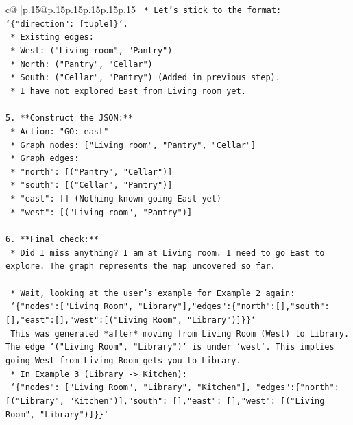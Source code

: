 \documentclass{article}
\begin{document}
{\begin{supertabular}{c@{$\;$}|p{.15\linewidth}@{}p{.15\linewidth}p{.15\linewidth}p{.15\linewidth}p{.15\linewidth}p{.15\linewidth}}
{{{\texttt{        *   Let's stick to the format: `\{"direction": {[}tuple{]}\}`.} \\
\texttt{        *   Existing edges:} \\
\texttt{            *   West: ("Living room", "Pantry")} \\
\texttt{            *   North: ("Pantry", "Cellar")} \\
\texttt{            *   South: ("Cellar", "Pantry") (Added in previous step).} \\
\texttt{    *   I have not explored East from Living room yet.} \\
\\ 
\texttt{5.  **Construct the JSON:**} \\
\texttt{    *   Action: "GO: east"} \\
\texttt{    *   Graph nodes: {[}"Living room", "Pantry", "Cellar"{]}} \\
\texttt{    *   Graph edges:} \\
\texttt{        *   "north": {[}("Pantry", "Cellar"){]}} \\
\texttt{        *   "south": {[}("Cellar", "Pantry"){]}} \\
\texttt{        *   "east": {[}{]} (Nothing known going East yet)} \\
\texttt{        *   "west": {[}("Living room", "Pantry"){]}} \\
\\ 
\texttt{6.  **Final check:**} \\
\texttt{    *   Did I miss anything? I am at Living room. I need to go East to explore. The graph represents the map uncovered so far.} \\
\\ 
\texttt{    *   Wait, looking at the user's example for Example 2 again:} \\
\texttt{        `\{"nodes":{[}"Living Room", "Library"{]},"edges":\{"north":{[}{]},"south":{[}{]},"east":{[}{]},"west":{[}("Living Room", "Library"){]}\}\}`} \\
\texttt{        This was generated *after* moving from Living Room (West) to Library. The edge `("Living Room", "Library")` is under `west`. This implies going West from Living Room gets you to Library.} \\
\texttt{    *   In Example 3 (Library {-}> Kitchen):} \\
\texttt{        `\{"nodes": {[}"Living Room", "Library", "Kitchen"{]}, "edges":\{"north": {[}("Library", "Kitchen"){]},"south": {[}{]},"east": {[}{]},"west": {[}("Living Room", "Library"){]}\}\}`} \\
}}}
\end{supertabular}}
\end{document}
